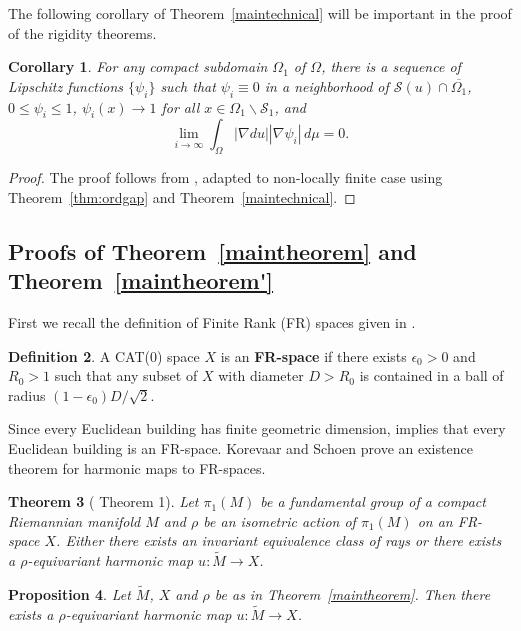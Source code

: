 \documentclass[12pt]{amsart}
\newtheorem{theorem}{Theorem}[section]
\newtheorem{proposition}[theorem]{Proposition}
\newtheorem{corollary}[theorem]{Corollary}
\theoremstyle{definition}
\newtheorem{definition}[theorem]{Definition}
\numberwithin{equation}{section}
\begin{document}
The following corollary of Theorem~\ref{maintechnical} will be important in the proof of the rigidity theorems.

\begin{corollary} \label{thm:maintech'}
For any compact subdomain $\Omega_1$ of $\Omega$, there is a sequence of Lipschitz functions $\{\psi_i\}$ such that  $\psi_i\equiv 0$ in a neighborhood of $\mathcal S(u) \cap \overline{\Omega_1}$, $0 \leq \psi_i \leq 1$, $\psi_i(x) \rightarrow 1$ for all $x \in \Omega_1 \backslash \mathcal S_1$, and  
\[
\lim_{i \rightarrow \infty} \int_\Omega |\nabla du| |\nabla \psi_i| \, d\mu =0.
\]
\end{corollary}

\begin{proof}
The proof follows from \cite[p.~227, third paragraph]{gromov-schoen}, adapted to non-locally finite case using Theorem~\ref{thm:ordgap} and Theorem~\ref{maintechnical}.
\end{proof}

\subsection{Proofs of Theorem~\ref{maintheorem} and Theorem~\ref{maintheorem'}}
First we recall the definition of Finite Rank (FR) spaces given in  \cite{korevaar-schoen3}.
\begin{definition}
A CAT(0) space $X$ is an {\bf FR-space} if there exists $\epsilon_0>0$ and $R_0>1$ such that any subset of $X$ with diameter $D>R_0$ is contained in a ball of radius $(1-\epsilon_0)D/\sqrt 2$.
\end{definition}
Since every Euclidean building has finite geometric dimension, \cite[Theorem 1.3]{caprace-lytchak} implies that every Euclidean building is an FR-space. 
Korevaar and Schoen prove an existence theorem for harmonic maps to FR-spaces.
\begin{theorem}[\cite{korevaar-schoen3} Theorem 1]
\label{thm:existenceKS3}
Let $\pi_1(M)$ be a fundamental group of a compact Riemannian manifold $M$ and $\rho$ be an isometric action of $\pi_1(M)$ on an FR-space $X$. Either there exists an invariant equivalence class of rays or there exists a $\rho$-equivariant harmonic map $u:\widetilde M \rightarrow X$.
\end{theorem}



\begin{proposition} \label{existence}
Let $\widetilde M$, $X$ and $\rho$ be as in Theorem~\ref{maintheorem}. Then there exists a $\rho$-equivariant harmonic map $u:\widetilde M \rightarrow X$.
\end{proposition}
\end{document}
